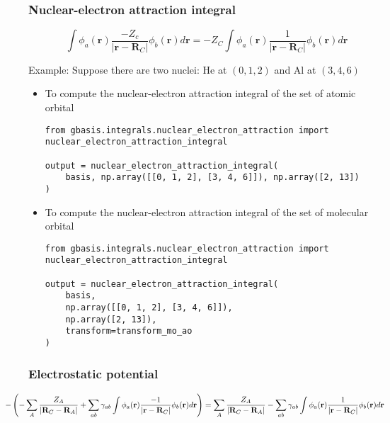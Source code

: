\documentclass[letterpaper]{article}
\begin{document}
\subsubsection{Nuclear-electron attraction integral}
\begin{equation}
  \label{eq:nuclear_electron_attraction}
  \int \phi_a(\mathbf{r}) \frac{-Z_c}{|\mathbf{r} - \mathbf{R}_C|} \phi_b(\mathbf{r}) d\mathbf{r}
  =
  -Z_C \int \phi_a(\mathbf{r}) \frac{1}{|\mathbf{r} - \mathbf{R}_C|} \phi_b(\mathbf{r}) d\mathbf{r}
\end{equation}

Example:
Suppose there are two nuclei: He at $(0, 1, 2)$ and Al at $(3, 4, 6)$
\begin{itemize}
\item To compute the nuclear-electron attraction integral of the set of atomic
  orbital
  \begin{lstlisting}[xleftmargin=-25pt]
from gbasis.integrals.nuclear_electron_attraction import nuclear_electron_attraction_integral

output = nuclear_electron_attraction_integral(
    basis, np.array([[0, 1, 2], [3, 4, 6]]), np.array([2, 13])
)
\end{lstlisting}
\item To compute the nuclear-electron attraction integral of the set of molecular
  orbital
  \begin{lstlisting}[xleftmargin=-25pt]
from gbasis.integrals.nuclear_electron_attraction import nuclear_electron_attraction_integral

output = nuclear_electron_attraction_integral(
    basis,
    np.array([[0, 1, 2], [3, 4, 6]]),
    np.array([2, 13]),
    transform=transform_mo_ao
)
\end{lstlisting}
\end{itemize}
\subsubsection{Electrostatic potential}
\begin{equation}
  \label{eq:nuclear_electron_attraction}
  \hspace{-3em}
  - \left(
    - \sum_A \frac{Z_A}{|\mathbf{R}_C - \mathbf{R}_A|}
    + \sum_{ab} \gamma_{ab} \int \phi_a(\mathbf{r}) \frac{-1}{|\mathbf{r} - \mathbf{R}_C|} \phi_b(\mathbf{r}) d\mathbf{r}
  \right)
  =
  \sum_A \frac{Z_A}{|\mathbf{R}_C - \mathbf{R}_A|}
  - \sum_{ab} \gamma_{ab} \int \phi_a(\mathbf{r}) \frac{1}{|\mathbf{r} - \mathbf{R}_C|} \phi_b(\mathbf{r}) d\mathbf{r}
\end{equation}
\end{document}
